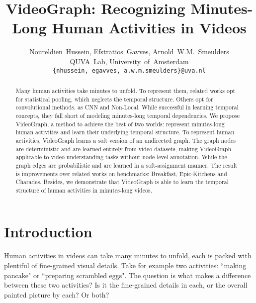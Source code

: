 \documentclass[10pt,twocolumn,letterpaper]{article}
\begin{document}
\title{VideoGraph: Recognizing Minutes-Long Human Activities in Videos}
\author{
Noureldien~Hussein, Efstratios~Gavves, Arnold~W.M.~Smeulders
\\
QUVA~Lab, University~of~Amsterdam
\\
{\tt\small\{nhussein, egavves, a.w.m.smeulders\}@uva.nl}}
\maketitle
\begin{abstract}
Many human activities take minutes to unfold.
To represent them, related works opt for statistical pooling, which neglects the temporal structure.
Others opt for convolutional methods, as CNN and Non-Local. While successful in learning temporal concepts, they fall short of modeling minutes-long temporal dependencies.
We propose VideoGraph, a method to achieve the best of two worlds: represent minutes-long human activities and learn their underlying temporal structure.
To represent human activities, VideoGraph learns a soft version of an undirected graph.
The graph nodes are deterministic and are learned entirely from video datasets, making VideoGraph applicable to video understanding tasks without node-level annotation.
While the graph edges are probabilistic and are learned in a soft-assignment manner.
The result is improvements over related works on benchmarks: Breakfast, Epic-Kitchens and Charades.
Besides, we demonstrate that VideoGraph is able to learn the temporal structure of human activities in minutes-long videos.
\end{abstract}

\section{Introduction}\label{sec:intro}
Human activities in videos can take many minutes to unfold, each is packed with plentiful of fine-grained visual details.
Take for example two activities: ``making pancake" or ``preparing scrambled eggs".
The question is what makes a difference between these two activities?
Is it the fine-grained details in each, or the overall painted picture by each? Or both?
\end{document}
